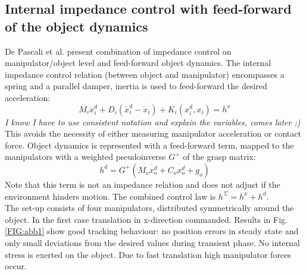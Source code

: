 \documentclass[a4paper,twoside, openright,12pt]{report}
\begin{document}

\subsection{Internal impedance control with feed-forward of the object dynamics}
De Pascali et al. \cite{DePascali_15} present combination of impedance control on manipulator/object level and feed-forward object dynamics. The internal impedance control relation (between object and manipulator) encompasses a spring and a parallel damper, inertia is used to feed-forward the desired acceleration: 
\begin{equation}
M_i \ddot{x}_i^d + D_i (\dot{x}_i^d - \dot{x}_i) + K_i(x_i^d,x_i) = h^x
\end{equation}
\textit{I know I have to use consistent notation and explain the variables, comes later ;)}
This avoids the necessity of either measuring manipulator acceleration or contact force.
Object dynamics is represented with a feed-forward term, mapped to the manipulators with a weighted pseudoinverse $ G^+ $ of the grasp matrix:
\begin{equation}
h^d = G^+ (M_o \ddot{x_o^d} + C_o \dot{x_o^d} + g_o)
\end{equation}
Note that this term is not an impedance relation and does not adjust if the environment hinders motion.
The combined control law is $ h^\Sigma = h^x + h^d $.\\
The set-up consists of four manipulators, distributed symmetrically around the object. In the first case translation in x-direction commanded. Results in Fig. \ref{FIG:abb1} show good tracking behaviour: no position errors in steady state and only small deviations from the desired values during transient phase. No internal stress is exerted on the object. Due to fast translation high manipulator forces occur.
\end{document}
